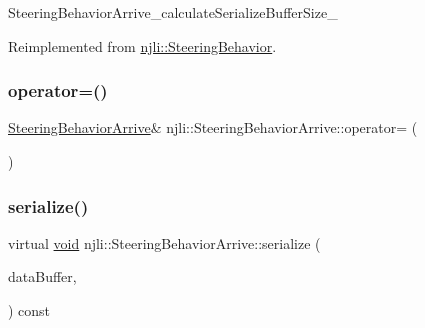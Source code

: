\begin{DoxyCodeInclude}
\end{DoxyCodeInclude}
Steering\+Behavior\+Arrive\+\_\+calculate\+Serialize\+Buffer\+Size\+\_\+ 

Reimplemented from \mbox{\hyperlink{classnjli_1_1_steering_behavior_acd7af46e42a8a3fc1208a47f50836ac8}{njli\+::\+Steering\+Behavior}}.

\mbox{\label{classnjli_1_1_steering_behavior_arrive_ad543d29289854fae252bdac1445fc141}} 
\subsubsection{\texorpdfstring{operator=()}{operator=()}}
{\footnotesize\ttfamily \mbox{\hyperlink{classnjli_1_1_steering_behavior_arrive}{Steering\+Behavior\+Arrive}}\& njli\+::\+Steering\+Behavior\+Arrive\+::operator= (\begin{DoxyParamCaption}\item[{const \mbox{\hyperlink{classnjli_1_1_steering_behavior_arrive}{Steering\+Behavior\+Arrive}} \&}]{ }\end{DoxyParamCaption})\hspace{0.3cm}{\ttfamily [protected]}}

\mbox{\label{classnjli_1_1_steering_behavior_arrive_af5a5fa8bcbc51a5e18a7c92f497a4251}} 
\subsubsection{\texorpdfstring{serialize()}{serialize()}}
{\footnotesize\ttfamily virtual \mbox{\hyperlink{_thread_8h_af1e856da2e658414cb2456cb6f7ebc66}{void}} njli\+::\+Steering\+Behavior\+Arrive\+::serialize (\begin{DoxyParamCaption}\item[{\mbox{\hyperlink{_thread_8h_af1e856da2e658414cb2456cb6f7ebc66}{void}} $\ast$}]{data\+Buffer,  }\item[{bt\+Serializer $\ast$}]{ }\end{DoxyParamCaption}) const\hspace{0.3cm}{\ttfamily [virtual]}}



